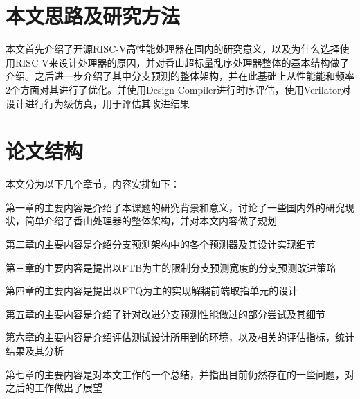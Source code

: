 


\section{本文思路及研究方法}

本文首先介绍了开源RISC-V高性能处理器在国内的研究意义，以及为什么选择使用RISC-V来设计处理器的原因，并对香山超标量乱序处理器整体的基本结构做了介绍。之后进一步介绍了其中分支预测的整体架构，并在此基础上从性能能和频率2个方面对其进行了优化。并使用Design Compiler进行时序评估，使用Verilator对设计进行行为级仿真，用于评估其改进结果

\section{论文结构}

本文分为以下几个章节，内容安排如下：

第一章的主要内容是介绍了本课题的研究背景和意义，讨论了一些国内外的研究现状，简单介绍了香山处理器的整体架构，并对本文内容做了规划

第二章的主要内容是介绍分支预测架构中的各个预测器及其设计实现细节

第三章的主要内容是提出以FTB为主的限制分支预测宽度的分支预测改进策略

第四章的主要内容是提出以FTQ为主的实现解耦前端取指单元的设计

第五章的主要内容是介绍了针对改进分支预测性能做过的部分尝试及其细节

第六章的主要内容是介绍评估测试设计所用到的环境，以及相关的评估指标，统计结果及其分析

第七章的主要内容是对本文工作的一个总结，并指出目前仍然存在的一些问题，对之后的工作做出了展望

